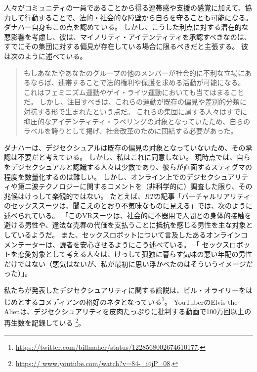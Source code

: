 \documentclass[paper=a4,book,openany]{jlreq} \usepackage{mystyle}
\begin{document}
人々がコミュニティの一員であることから得る連帯感や支援の感覚に加えて、協力して行動することで、法的・社会的な障壁から自らを守ることも可能になる。
ダナハー自身もこの点を認めている。
しかし、こうした利点に対する潜在的な悪影響を考慮し、彼は、マイノリティ・アイデンティティを承認すべきなのは、すでにその集団に対する偏見が存在している場合に限るべきだと主張する。
彼は次のように述べている。

\begin{quote}
もしあなたやあなたのグループの他のメンバーが社会的に不利な立場にあるならば、連帯することで法的権利や保護を求める活動が可能になる。
これはフェミニズム運動やゲイ・ライツ運動においても当てはまることだ。
しかし、注目すべきは、これらの運動が既存の偏見や差別的分類に対抗する形で生まれたという点だ。
これらの集団に属する人々はすでに抑圧的なアイデンティティ・ラベリングの対象となっていたため、自らのラベルを誇りとして掲げ、社会改革のために団結する必要があった。
\citep[p.395]{danaher20:_sexual}

\end{quote}

ダナハーは、デジセクシュアルは既存の偏見の対象となっていないため、その承認は不要だと考えている。
しかし、私はこれに同意しない。
現時点では、自らをデジセクシュアルと認識する人々は少数であり、彼らが直面するスティグマの程度を数量化するのは難しい。
しかし、オンライン上でのデジセクシュアリティや第二波テクノロジーに関するコメントを（非科学的に）調査した限り、その兆候はけっして楽観的ではない。
たとえば、\emph{RT}の記事「バーチャルリアリティのセックススーツは、聞こえのとおり不気味なものに見える」では、次のように述べられている。
「このVRスーツは、社会的に不器用で人間との身体的接触を避ける男性や、違法な売春の代価を支払うことに抵抗を感じる男性を主な対象としているようだ\citep{rt16:_virtual_realit_sex_suit_looks}。
また、セックスロボットについて言及したあるオンラインコメンテーターは、読者を安心させるようにこう述べている。
「 セックスロボットを恋愛対象として考える人々は、けっして孤独に暮らす気味の悪い年配の男性だけではない（悪気はないが、私が最初に思い浮かべたのはそういうイメージだった）」\citep{richmond18:_rise_sex_robot}。

私たちが発表したデジセクシュアリティに関する論説は、ビル・オライリーをはじめとするコメディアンの格好のネタとなっている\footnote{\url{https://twitter.com/billmaher/status/1228568002674610177}.}。
YouTuberのElvis the Alienは、デジセクシュアリティを皮肉たっぷりに批判する動画で100万回以上の再生数を記録している
\footnote{\url{https:// www.youtube.com/watch?v=84-_i4jP_08}.}。
\end{document}
